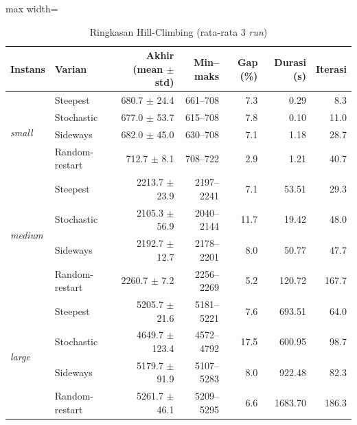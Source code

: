 \begin{table}[H]\centering\small
\caption{Ringkasan Hill-Climbing (rata-rata 3 \textit{run})}\label{tab:hc-summary}
\begin{adjustbox}{max width=\textwidth}\begin{tabular}{l l r r r r r}
\toprule
\textbf{Instans} & \textbf{Varian} & \textbf{Akhir (mean $\pm$ std)} & \textbf{Min--maks} & \textbf{Gap (\%)} & \textbf{Durasi (s)} & \textbf{Iterasi} \\
\midrule
\multirow{4}{*}{\textit{small}} & Steepest & 680.7 $\pm$ 24.4 & 661--708 & 7.3 & 0.29 & 8.3 \\
 & Stochastic & 677.0 $\pm$ 53.7 & 615--708 & 7.8 & 0.10 & 11.0 \\
 & Sideways & 682.0 $\pm$ 45.0 & 630--708 & 7.1 & 1.18 & 28.7 \\
 & Random-restart & 712.7 $\pm$ 8.1 & 708--722 & 2.9 & 1.21 & 40.7 \\
\midrule
\multirow{4}{*}{\textit{medium}} & Steepest & 2213.7 $\pm$ 23.9 & 2197--2241 & 7.1 & 53.51 & 29.3 \\
 & Stochastic & 2105.3 $\pm$ 56.9 & 2040--2144 & 11.7 & 19.42 & 48.0 \\
 & Sideways & 2192.7 $\pm$ 12.7 & 2178--2201 & 8.0 & 50.77 & 47.7 \\
 & Random-restart & 2260.7 $\pm$ 7.2 & 2256--2269 & 5.2 & 120.72 & 167.7 \\
\midrule
\multirow{4}{*}{\textit{large}} & Steepest & 5205.7 $\pm$ 21.6 & 5181--5221 & 7.6 & 693.51 & 64.0 \\
 & Stochastic & 4649.7 $\pm$ 123.4 & 4572--4792 & 17.5 & 600.95 & 98.7 \\
 & Sideways & 5179.7 $\pm$ 91.9 & 5107--5283 & 8.0 & 922.48 & 82.3 \\
 & Random-restart & 5261.7 $\pm$ 46.1 & 5209--5295 & 6.6 & 1683.70 & 186.3 \\
\bottomrule
\end{tabular}\end{adjustbox}
\end{table}
